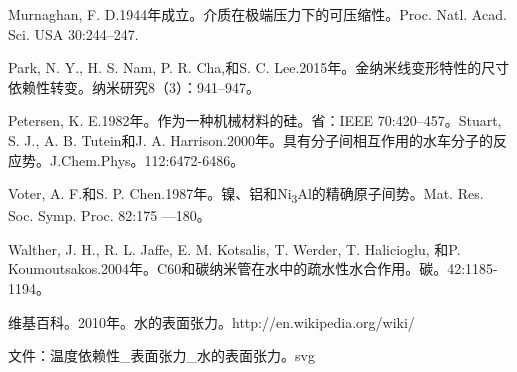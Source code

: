 Murnaghan, F. D.1944年成立。介质在极端压力下的可压缩性。Proc. Natl.
Acad. Sci. USA 30:244--247.

Park, N. Y., H. S. Nam, P. R. Cha,和S. C.
Lee.2015年。金纳米线变形特性的尺寸依赖性转变。纳米研究8（3）：941--947。

Petersen, K. E.1982年。作为一种机械材料的硅。省：IEEE
70:420--457。Stuart, S. J., A. B. Tutein和J. A.
Harrison.2000年。具有分子间相互作用的水车分子的反应势。J.Chem.Phys。112:6472-6486。

Voter, A. F.和S. P.
Chen.1987年。镍、铝和Ni\textsubscript{3}Al的精确原子间势。Mat. Res. Soc.
Symp. Proc. 82:175 ---180。

Walther, J. H., R. L. Jaffe, E. M. Kotsalis, T. Werder, T. Halicioglu,
和P.
Koumoutsakos.2004年。C60和碳纳米管在水中的疏水性水合作用。碳。42:1185-1194。

维基百科。2010年。水的表面张力。http://en.wikipedia.org/wiki/

文件：温度依赖性\_表面张力\_水的表面张力。svg

